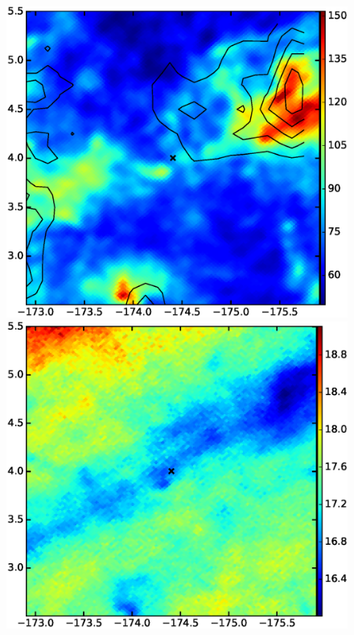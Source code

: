 \documentclass[preprint]{emulateapj}
\begin{document}
\begin{figure}[h!]
\includegraphics[scale=0.21]{fig/src_eg_apd0_r1c2.eps}
\includegraphics[scale=0.21]{fig/src_eg_apd0_r1c3.eps}
%


\end{figure}
\end{document}

